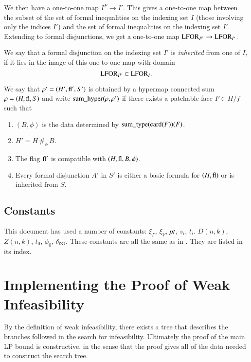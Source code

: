 We then have a one-to-one map $I^F \to I'$.  This gives a
one-to-one map between the subset of the set of formal
inequalities on the indexing set $I$ (those involving only the
indices $I'$) and the set of formal inequalities on the indexing
set $I'$. Extending to formal disjunctions, we get a one-to-one
map ${\operatorname{LFOR}}_{I^F}\to {\operatorname{LFOR}}_{I'}$.

\begin{definition}  We say that a formal disjunction on the
indexing set $I'$ is {\it inherited} from one of $I$, if it lies
in the image of this one-to-one map with domain
    $${\operatorname{LFOR}}_{I^F}\subset {\operatorname{LFOR}}_I.$$
\end{definition}



\begin{definition}
We say that $\rho'=(H',{\operatorname{fl}}',S')$ is obtained by a hypermap
connected sum $\rho =(H,{\operatorname{fl}},S)$  and write
${\operatorname{sum\_hyper}}(\rho,\rho')$ if there exists a patchable face
$F\in H/f$ such that
    \begin{enumerate}
    \item $(B,\phi)$ is the data determined by ${\operatorname{sum\_type}}({\operatorname{card}}(F))(F)$.
    \item $H' = H\,\#_\phi\, B$.
    \item The flag ${\operatorname{fl}}'$ is compatible with $(H,{\operatorname{fl}},B,\phi)$.
    \item Every formal disjunction $A'$ in $S'$ is either a basic
    formula for $(H,{\operatorname{fl}})$ or is inherited from $S$.
    \end{enumerate}
\end{definition}

\subsection{Constants}

This document has used a number of constants: $\xi_\Gamma$,
$\xi_V$, $\hbox{\it pt}$, $s_i$, $t_i$. $D(n,k)$, $Z(n,k)$, $t_0$, $\phi_0$,
$\delta_{\operatorname{oct}}$.
%
These constants are all the same as in \cite{DCG}.  They are
listed in its index.


\section{Implementing the Proof of Weak Infeasibility}

By the definition of weak infeasibility, there exists a tree that
describes the branches followed in the search for infeasibility.
Ultimately the proof of the main LP bound is constructive, in the
sense that the proof gives all of the data needed to construct the
search tree.

